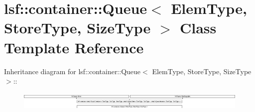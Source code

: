 \hypertarget{classlsf_1_1container_1_1Queue}{
\section{lsf::container::Queue$<$ ElemType, StoreType, SizeType $>$ Class Template Reference}
\label{classlsf_1_1container_1_1Queue}
}
Inheritance diagram for lsf::container::Queue$<$ ElemType, StoreType, SizeType $>$::\begin{figure}[H]
\begin{center}
\leavevmode
\includegraphics[height=0.892667cm]{classlsf_1_1container_1_1Queue}
\end{center}
\end{figure}
